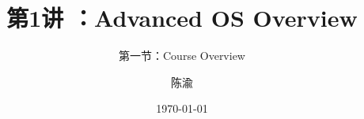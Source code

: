 


\title[第1讲]{第1讲 ：Advanced OS Overview} %
\subtitle{第一节：Course Overview }
\author{陈渝} %
\date{\today} %




\begin{frame}
\titlepage %
\end{frame}

